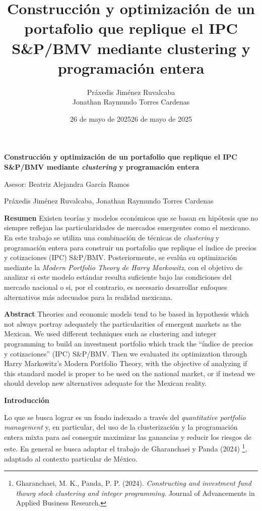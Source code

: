 \documentclass[
]{article}
\date{26 de mayo de 2025}
\begin{document}
\title{Construcción y optimización de un portafolio que replique el IPC
S\&P/BMV mediante clustering y programación entera}
\author{
	Práxedis Jiménez Ruvalcaba \\
	Jonathan Raymundo Torres Cardenas
}
\date{26 de mayo de 2025}
\textbf{Construcción y optimización de un portafolio que replique el IPC
S\&P/BMV mediante \emph{clustering} y programación entera}

Asesor: Beatriz Alejandra García Ramos

Práxedis Jiménez Ruvalcaba, Jonathan Raymundo Torres Cardenas


\textbf{Resumen}
Existen teorías y modelos económicos que se basan en hipótesis que no siempre
reflejan las particularidades de mercados emergentes como el mexicano. En este
trabajo se utiliza una combinación de técnicas de \emph{clustering} y programación entera
para construir un portafolio que replique el índice de precios y cotizaciones (IPC)
S\&P/BMV. Posteriormente, se evalúa su optimización mediante la \emph{Modern Portfolio
Theory de Harry Markowitz}, con el objetivo de analizar si este modelo estándar
resulta suficiente bajo las condiciones del mercado nacional o si, por el contrario, es
necesario desarrollar enfoques alternativos más adecuados para la realidad
mexicana.

\textbf{Abstract}
Theories and economic models tend to be based in hypothesis which not always
portray adequately the particularities of emergent markets as the Mexican. We used
different techniques such as clustering and integer programming to build an
investment portfolio which track the “índice de precios y cotizaciones” (IPC)
S\&P/BMV. Then we evaluated its optimization through Harry Markowitz’s Modern
Portfolio Theory, with the objective of analyzing if this standard model is proper to be
used on the national market, or if instead we should develop new alternatives
adequate for the Mexican reality.

\textbf{Introducción}

Lo que se busca lograr es un fondo indexado a través del
\emph{quantitative portfolio management} y, en particular, del uso de la
clusterización y la programación entera mixta para así conseguir
maximizar las ganancias y reducir los riesgos de este. En general se
busca adaptar el trabajo de Gharanchaei y Panda (2024)
\footnote{Gharanchaei, M. K., Panda, P. P. (2024). 
\emph{Constructing and investment fund thourg stock clustering and integer programming}.
Journal of Advancements in Applied Business Research.}, adaptado al
contexto particular de México.
\end{document}
